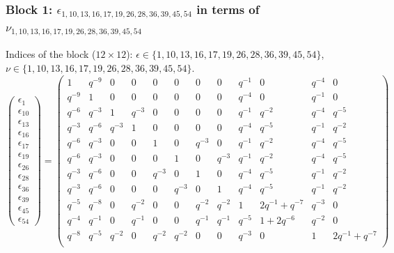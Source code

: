 \subsubsection{Block 1: $\epsilon_{1, 10, 13, 16, 17, 19, 26, 28, 36, 39, 45, 54}$ in terms of $\nu_{1, 10, 13, 16, 17, 19, 26, 28, 36, 39, 45, 54}$}
Indices of the block ($12\times 12$): $\epsilon \in \{1, 10, 13, 16, 17, 19, 26, 28, 36, 39, 45, 54\}$, $\nu \in \{1, 10, 13, 16, 17, 19, 26, 28, 36, 39, 45, 54\}$.
\[
\begin{pmatrix}
\epsilon_{1} \\
\epsilon_{10} \\
\epsilon_{13} \\
\epsilon_{16} \\
\epsilon_{17} \\
\epsilon_{19} \\
\epsilon_{26} \\
\epsilon_{28} \\
\epsilon_{36} \\
\epsilon_{39} \\
\epsilon_{45} \\
\epsilon_{54}
\end{pmatrix}
=
\begin{pmatrix}
1 & q^{-9} & 0 & 0 & 0 & 0 & 0 & 0 & q^{-1} & 0 & q^{-4} & 0 \\
q^{-9} & 1 & 0 & 0 & 0 & 0 & 0 & 0 & q^{-4} & 0 & q^{-1} & 0 \\
q^{-6} & q^{-3} & 1 & q^{-3} & 0 & 0 & 0 & 0 & q^{-1} & q^{-2} & q^{-4} & q^{-5} \\
q^{-3} & q^{-6} & q^{-3} & 1 & 0 & 0 & 0 & 0 & q^{-4} & q^{-5} & q^{-1} & q^{-2} \\
q^{-6} & q^{-3} & 0 & 0 & 1 & 0 & q^{-3} & 0 & q^{-1} & q^{-2} & q^{-4} & q^{-5} \\
q^{-6} & q^{-3} & 0 & 0 & 0 & 1 & 0 & q^{-3} & q^{-1} & q^{-2} & q^{-4} & q^{-5} \\
q^{-3} & q^{-6} & 0 & 0 & q^{-3} & 0 & 1 & 0 & q^{-4} & q^{-5} & q^{-1} & q^{-2} \\
q^{-3} & q^{-6} & 0 & 0 & 0 & q^{-3} & 0 & 1 & q^{-4} & q^{-5} & q^{-1} & q^{-2} \\
q^{-5} & q^{-8} & 0 & q^{-2} & 0 & 0 & q^{-2} & q^{-2} & 1 & 2q^{-1}+q^{-7} & q^{-3} & 0 \\
q^{-4} & q^{-1} & 0 & q^{-1} & 0 & 0 & q^{-1} & q^{-1} & q^{-5} & 1+2q^{-6} & q^{-2} & 0 \\
q^{-8} & q^{-5} & q^{-2} & 0 & q^{-2} & q^{-2} & 0 & 0 & q^{-3} & 0 & 1 & 2q^{-1}+q^{-7} \\

\end{pmatrix}\]
